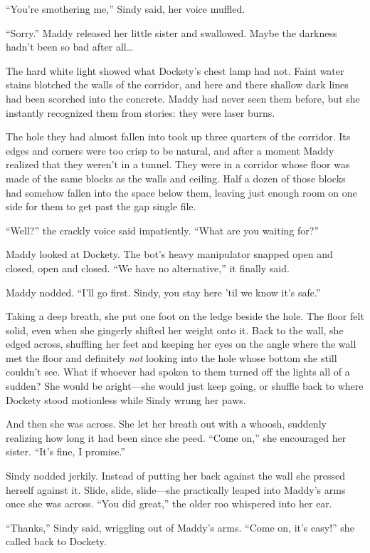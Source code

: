 \documentclass[10pt]{article}
\begin{document}
``You're smothering me,'' Sindy said, her voice muffled.

``Sorry.'' Maddy released her little sister and swallowed. Maybe the
darkness hadn't been so bad after all\ldots{}

The hard white light showed what Dockety's chest lamp had not. Faint
water stains blotched the walls of the corridor, and here and there
shallow dark lines had been scorched into the concrete. Maddy had never
seen them before, but she instantly recognized them from stories: they
were laser burns.

The hole they had almost fallen into took up three quarters of the
corridor. Its edges and corners were too crisp to be natural, and after
a moment Maddy realized that they weren't in a tunnel. They were in a
corridor whose floor was made of the same blocks as the walls and
ceiling. Half a dozen of those blocks had somehow fallen into the space
below them, leaving just enough room on one side for them to get past
the gap single file.

``Well?'' the crackly voice said impatiently. ``What are you waiting
for?''

Maddy looked at Dockety. The bot's heavy manipulator snapped open and
closed, open and closed. ``We have no alternative,'' it finally said.

Maddy nodded. ``I'll go first. Sindy, you stay here 'til we know it's
safe.''

Taking a deep breath, she put one foot on the ledge beside the hole. The
floor felt solid, even when she gingerly shifted her weight onto it.
Back to the wall, she edged across, shuffling her feet and keeping her
eyes on the angle where the wall met the floor and definitely \emph{not}
looking into the hole whose bottom she still couldn't see. What if
whoever had spoken to them turned off the lights all of a sudden? She
would be aright---she would just keep going, or shuffle back to where
Dockety stood motionless while Sindy wrung her paws.

And then she was across. She let her breath out with a whoosh, suddenly
realizing how long it had been since she peed. ``Come on,'' she
encouraged her sister. ``It's fine, I promise.''

Sindy nodded jerkily. Instead of putting her back against the wall she
pressed herself against it. Slide, slide, slide---she practically leaped
into Maddy's arms once she was across. ``You did great,'' the older roo
whispered into her ear.

``Thanks,'' Sindy said, wriggling out of Maddy's arms. ``Come on, it's
easy!'' she called back to Dockety.
\end{document}
